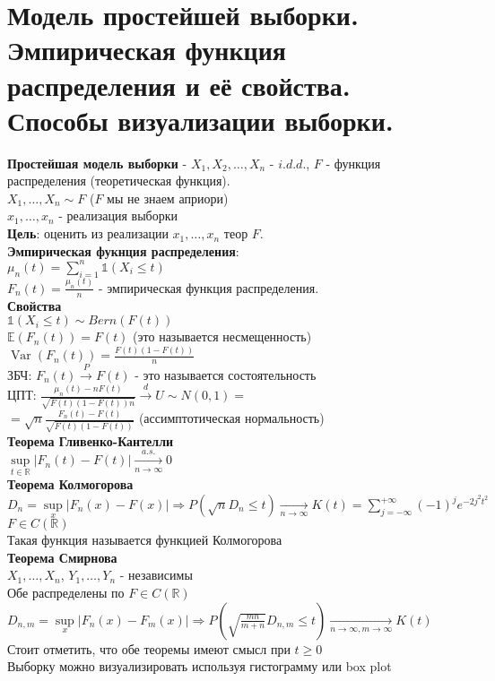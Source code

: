 \documentclass{article}
\newcommand\0{\mathbb{0}}
\DeclareMathOperator{\Var}{Var}
\newcommand\1{\mathbb{1}}
\renewcommand{\bf}{\textbf}
\begin{document}
\section{Модель простейшей выборки. Эмпирическая функция распределения и её свойства. Способы
визуализации выборки.}
\textbf{Простейшая модель выборки} - $X_1, X_2, \dots, X_n$ - $i.d.d.$, $F$ - функция распределения (теоретическая функция).\\
$X_1, \dots, X_n \sim F$ ($F$ мы не знаем априори)\\
$x_1, \dots, x_n$ - реализация выборки\\
\textbf{Цель}: оценить из реализации $x_1, \dots, x_n$ теор $F$.\\
\textbf{Эмпирическая фукнция распределения}:\\
$\mu_n(t) = \displaystyle\sum_{i = 1}^{n} \mathbb{1}(X_i \leq t)$\\
$F_n(t) = \frac{\mu_n(t)}{n}$ - эмпирическая функция распределения.\\
\newpage
\bf{Свойства}\\
$\mathbb{1}(X_i \leq t) \sim Bern(F(t))$\\
$\mathbb{E}(F_n(t)) = F(t)$ (это называется несмещенность)\\
$\Var(F_n(t)) = \frac{F(t)(1 - F(t))}{n}$\\
ЗБЧ: $F_n(t) \xrightarrow{\text{$P$}} F(t)$ - это называется состоятельность\\
ЦПТ: $\frac{\mu_n(t) - nF(t)}{\sqrt{F(t)(1 - F(t))n}} \xrightarrow{d} U \sim N(0,1) = $\\
$= \sqrt{n}\frac{F_n(t) - F(t)}{\sqrt{F(t)(1 - F(t))}}$ (ассимптотическая нормальность)\\
\textbf{Теорема Гливенко-Кантелли}\\
$\underset{t \in \mathbb{R}}{\sup}|F_n(t) - F(t)| \xrightarrow[n \to \infty]{a.s.} 0$\\
\textbf{Теорема Колмогорова}\\
$D_n = \underset{x}{\sup} |F_n(x) - F(x)| \Rightarrow P(\sqrt{n} D_n \leq t) \xrightarrow[n \to \infty]{} K(t) = \displaystyle\sum_{j = -\infty}^{+\infty} (-1)^je^{-2j^2t^2}$\\
$F \in C(\mathbb{R})$\\
Такая функция называется функцией Колмогорова\\
\textbf{Теорема Смирнова}\\
$X_1, \dots, X_n$, $Y_1, \dots, Y_n$ - независимы\\
Обе распределены по $F \in C(\mathbb{R})$\\
$D_{n,m} = \underset{x}{\sup} |F_n(x) - F_m(x)| \Rightarrow P(\sqrt{\frac{mn}{m + n}} D_{n,m} \leq t) \xrightarrow[n \to \infty, m \to \infty]{} K(t)$\\
Стоит отметить, что обе теоремы имеют смысл при $t \geq 0$\\
Выборку можно визуализировать используя гистограмму или box plot\\
\end{document}
